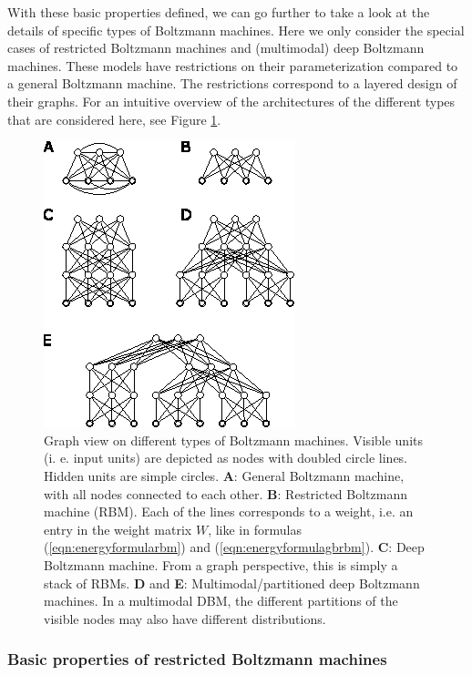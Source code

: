 \documentclass[12pt]{article}
\begin{document}
With these basic properties defined, we can go further to take a look at the details of specific types of Boltzmann machines.
Here we only consider the special cases of restricted Boltzmann machines and (multimodal) deep Boltzmann machines.
These models have restrictions on their parameterization compared to a general Boltzmann machine.
The restrictions correspond to a layered design of their graphs.
For an intuitive overview of the architectures of the different types that are considered here, see Figure \ref{fig:bmsoverview}.

\begin{figure}[h]

   \centering
   \includegraphics[scale=3.]{images/BMsOverview.eps}
   \caption{Graph view on different types of Boltzmann machines. Visible units (i. e. input units) are depicted as nodes with doubled circle lines. Hidden units are simple circles.
 {\bf A}: General Boltzmann machine, with all nodes connected to each other. {\bf B}: Restricted Boltzmann machine (RBM). Each of the lines corresponds to a weight, i.e. an entry in the weight matrix $W$, like in formulas (\ref{eqn:energyformularbm}) and (\ref{eqn:energyformulagbrbm}).
{\bf C}: Deep Boltzmann machine. From a graph perspective, this is simply a stack of RBMs.
{\bf D} and {\bf E}: Multimodal/partitioned deep Boltzmann machines. In a multimodal DBM, the different partitions of the visible nodes may also have different distributions.}
   \label{fig:bmsoverview}
 \end{figure}


\subsubsection{Basic properties of restricted Boltzmann machines}\label{rbmtypes}
\end{document}
